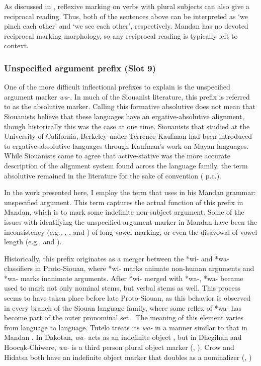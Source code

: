 As discussed in , reflexive marking on verbs with plural subjects can also give a reciprocal reading. Thus, both of the sentences above can be interpreted as `we pinch each other' and `we see each other', respectively. Mandan has no devoted reciprocal marking morphology, so any reciprocal reading is typically left to context.

\subsubsection{Unspecified argument prefix (Slot 9)}\label{SubsubsUnspecifiedArgument}

One of the more difficult inflectional prefixes to explain is the unspecified argument marker \textit{wa}-. In much of the Siouanist literature, this prefix is referred to as the absolutive marker. Calling this formative absolutive does not mean that Siouanists believe that these languages have an ergative-absolutive alignment, though historically this was the case at one time. Siouanists that studied at the University of California, Berkeley under Terrence Kaufman had been introduced to ergative-absolutive languages through Kaufman's work on Mayan languages. While Siouanists came to agree that active-stative was the more accurate description of the alignment system found across the language family, the term absolutive remained in the literature for the sake of convention (\citeauthor{rankin2010} p.c.).

In the work presented here, I employ the term that \citet{mixco1997a} uses in his Mandan grammar: unspecified argument. This term captures the actual function of this prefix in Mandan, which is to mark some indefinite non-subject argument. Some of the issues with identifying the unspecified argument marker in Mandan have been the inconsistency (e.g., \citealt{kennard1936}, \citealt{mixco1997a}, and \citealt{trechter2012b}) of long vowel marking, or even the disavowal of vowel length (e.g., \citealt{hollow1970} and \citealt{coberly1979}).

Historically, this prefix originates as a merger between the *wi- and *wa- classifiers in Proto-Siouan, where *wi- marks animate non-human arguments and *wa- marks inanimate arguments. After *wi- merged with *wa-, *wa- became used to mark not only nominal stems, but verbal stems as well. This process seems to have taken place before late Proto-Siouan, as this behavior is observed in every branch of the Siouan language family, where some reflex of *wa- has become part of the outer pronominal set \citep{rankinetalnd}. The meaning of this element varies from language to language. Tutelo treats its \textit{wa-} in a manner similar to that in Mandan \citep[87]{oliverio1997}. In Dakotan, \textit{wa-} acts as an indefinite object \citep[16]{ingham2003}, but in Dhegihan and Hoocąk-Chiwere, \textit{wa-} is a third person plural object marker (\citealt[75]{quintero2004}, \citealt[286]{helmbrechtlehmann2008}). Crow and Hidatsa both have an indefinite object marker that doubles as a nominalizer (\citealt[242]{boyle2007}, \citealt[195]{graczyk2007})

